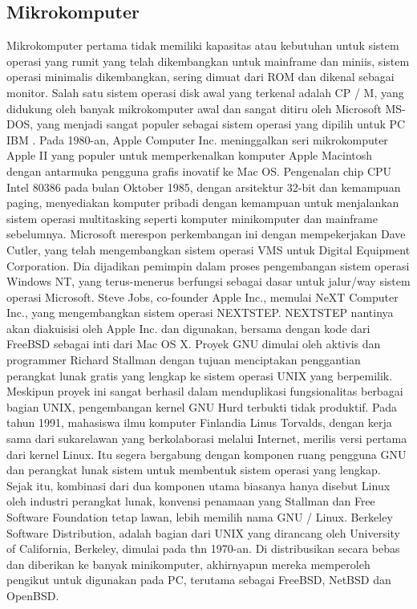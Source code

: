 \subsection{Mikrokomputer}
	\begin{enumerate}
		Mikrokomputer pertama tidak memiliki kapasitas atau kebutuhan untuk sistem operasi yang rumit yang telah dikembangkan untuk mainframe dan miniis, sistem operasi minimalis dikembangkan, sering dimuat dari ROM dan dikenal sebagai monitor. Salah satu sistem operasi disk awal yang terkenal adalah CP / M, yang didukung oleh banyak mikrokomputer awal dan sangat ditiru oleh Microsoft MS-DOS, yang menjadi sangat populer sebagai sistem operasi yang dipilih untuk PC IBM . Pada 1980-an, Apple Computer Inc.  meninggalkan seri mikrokomputer Apple II yang populer untuk memperkenalkan komputer Apple Macintosh dengan antarmuka pengguna grafis inovatif  ke Mac OS.
		Pengenalan chip CPU Intel 80386 pada bulan Oktober 1985,  dengan arsitektur 32-bit dan kemampuan paging, menyediakan komputer pribadi dengan kemampuan untuk menjalankan sistem operasi multitasking seperti komputer minikomputer dan mainframe sebelumnya. Microsoft merespon perkembangan ini dengan mempekerjakan Dave Cutler, yang telah mengembangkan sistem operasi VMS untuk Digital Equipment Corporation. Dia dijadikan pemimpin dalam proses  pengembangan sistem operasi Windows NT, yang terus-menerus berfungsi sebagai dasar untuk jalur/way sistem operasi Microsoft. Steve Jobs, co-founder Apple Inc., memulai NeXT Computer Inc., yang mengembangkan sistem operasi NEXTSTEP. NEXTSTEP nantinya akan diakuisisi oleh Apple Inc. dan digunakan, bersama dengan kode dari FreeBSD sebagai inti dari Mac OS X.
		Proyek GNU dimulai oleh aktivis dan programmer Richard Stallman dengan tujuan menciptakan penggantian perangkat lunak gratis yang lengkap ke sistem operasi UNIX yang berpemilik. Meskipun proyek ini sangat berhasil dalam menduplikasi fungsionalitas berbagai bagian UNIX, pengembangan kernel GNU Hurd terbukti tidak produktif. Pada tahun 1991, mahasiswa ilmu komputer Finlandia Linus Torvalds, dengan kerja sama dari sukarelawan yang berkolaborasi melalui Internet, merilis versi pertama dari kernel Linux. Itu segera bergabung dengan komponen ruang pengguna GNU dan perangkat lunak sistem untuk membentuk sistem operasi yang lengkap. Sejak itu, kombinasi dari dua komponen utama biasanya hanya disebut Linux oleh industri perangkat lunak, konvensi penamaan yang Stallman dan Free Software Foundation tetap lawan, lebih memilih nama GNU / Linux. Berkeley Software Distribution, adalah bagian dari UNIX yang dirancang oleh University of California, Berkeley, dimulai pada thn 1970-an. Di distribusikan secara bebas dan diberikan ke banyak minikomputer, akhirnyapun mereka  memperoleh pengikut untuk digunakan pada PC, terutama sebagai FreeBSD, NetBSD dan OpenBSD.
	\end{enumerate}
